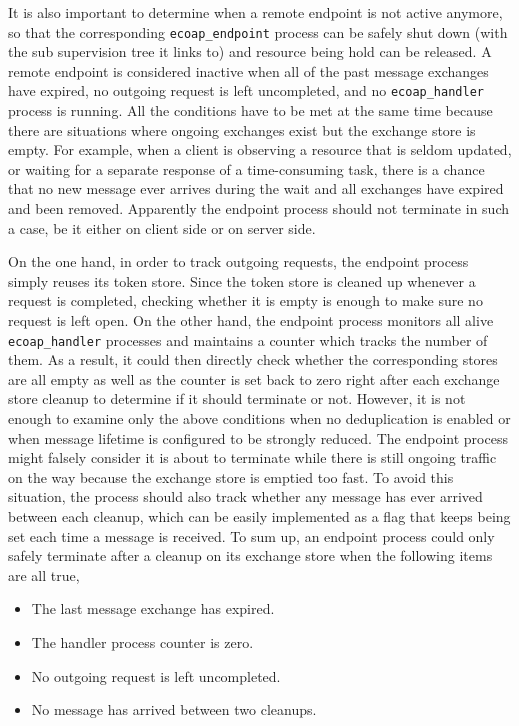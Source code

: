 It is also important to determine when a remote endpoint is not active anymore, so that the corresponding \verb|ecoap_endpoint| process can be safely shut down (with the sub supervision tree it links to) and resource being hold can be released. A remote endpoint is considered inactive when all of the past message exchanges have expired, no outgoing request is left uncompleted, and no \verb|ecoap_handler| process is running. All the conditions have to be met at the same time because there are situations where ongoing exchanges exist but the exchange store is empty. For example, when a client is observing a resource that is seldom updated, or waiting for a separate response of a time-consuming task, there is a chance that no new message ever arrives during the wait and all exchanges have expired and been removed. Apparently the endpoint process should not terminate in such a case, be it either on client side or on server side. 

On the one hand, in order to track outgoing requests, the endpoint process simply reuses its token store. Since the token store is cleaned up whenever a request is completed, checking whether it is empty is enough to make sure no request is left open. On the other hand, the endpoint process monitors all alive \verb|ecoap_handler| processes and maintains a counter which tracks the number of them. As a result, it could then directly check whether the corresponding stores are all empty as well as the counter is set back to zero right after each exchange store cleanup to determine if it should terminate or not. However, it is not enough to examine only the above conditions when no deduplication is enabled or when message lifetime is configured to be strongly reduced. The endpoint process might falsely consider it is about to terminate while there is still ongoing traffic on the way because the exchange store is emptied too fast. To avoid this situation, the process should also track whether any message has ever arrived between each cleanup, which can be easily implemented as a flag that keeps being set each time a message is received. To sum up, an endpoint process could only safely terminate after a cleanup on its exchange store when the following items are all true,

\begin{itemize}

\item The last message exchange has expired.
\item The handler process counter is zero.
\item No outgoing request is left uncompleted.
\item No message has arrived between two cleanups. 

\end{itemize}

